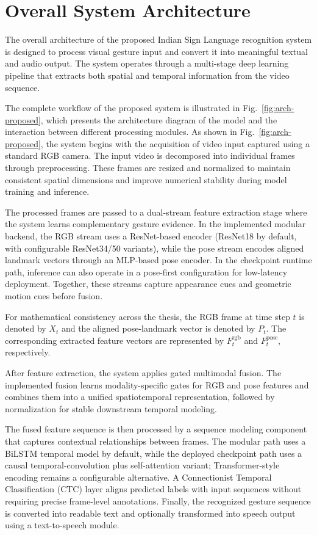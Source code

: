 \section{Overall System Architecture}
The overall architecture of the proposed Indian Sign Language recognition system is designed to process visual gesture input and convert it into meaningful textual and audio output. The system operates through a multi-stage deep learning pipeline that extracts both spatial and temporal information from the video sequence.

The complete workflow of the proposed system is illustrated in Fig.~\ref{fig:arch-proposed}, which presents the architecture diagram of the model and the interaction between different processing modules. As shown in Fig.~\ref{fig:arch-proposed}, the system begins with the acquisition of video input captured using a standard RGB camera. The input video is decomposed into individual frames through preprocessing. These frames are resized and normalized to maintain consistent spatial dimensions and improve numerical stability during model training and inference.

The processed frames are passed to a dual-stream feature extraction stage where the system learns complementary gesture evidence. In the implemented modular backend, the RGB stream uses a ResNet-based encoder (ResNet18 by default, with configurable ResNet34/50 variants), while the pose stream encodes aligned landmark vectors through an MLP-based pose encoder. In the checkpoint runtime path, inference can also operate in a pose-first configuration for low-latency deployment. Together, these streams capture appearance cues and geometric motion cues before fusion.

For mathematical consistency across the thesis, the RGB frame at time step $t$ is denoted by $X_t$ and the aligned pose-landmark vector is denoted by $P_t$. The corresponding extracted feature vectors are represented by $F_t^{\mathrm{rgb}}$ and $F_t^{\mathrm{pose}}$, respectively.

After feature extraction, the system applies gated multimodal fusion. The implemented fusion learns modality-specific gates for RGB and pose features and combines them into a unified spatiotemporal representation, followed by normalization for stable downstream temporal modeling.

The fused feature sequence is then processed by a sequence modeling component that captures contextual relationships between frames. The modular path uses a BiLSTM temporal model by default, while the deployed checkpoint path uses a causal temporal-convolution plus self-attention variant; Transformer-style encoding remains a configurable alternative. A Connectionist Temporal Classification (CTC) layer aligns predicted labels with input sequences without requiring precise frame-level annotations. Finally, the recognized gesture sequence is converted into readable text and optionally transformed into speech output using a text-to-speech module.

